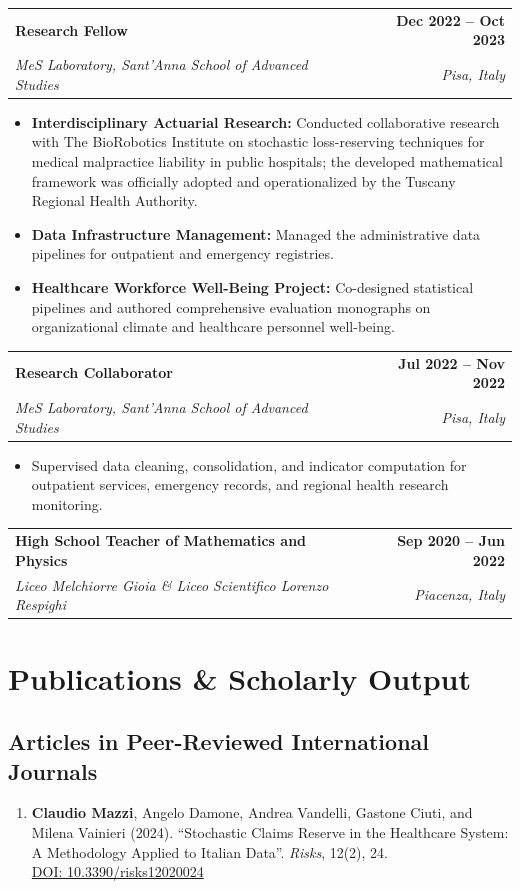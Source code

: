 \documentclass[10pt,a4paper]{article}
\makeatletter
\newcommand{\myname}{\textbf{Claudio Mazzi}}
\newcommand{\cventry}[5]{
  \vspace{2pt}
  \noindent
  \begin{tabularx}{\textwidth}{@{}X r@{}}
    \textbf{#1} & \textcolor{secondary}{\textbf{#2}} \\
    \textit{#3} & \textit{\textcolor{textdark}{#4}}
  \end{tabularx}
  \vspace{-1pt}
  {\small #5}
  \vspace{2pt}
}
\newcommand{\cvsimpleentry}[4]{
  \vspace{2pt}
  \noindent
  \begin{tabularx}{\textwidth}{@{}X r@{}}
    \textbf{#1} & \textcolor{secondary}{\textbf{#2}} \\
    \textit{#3} & \textit{\textcolor{textdark}{#4}}
  \end{tabularx}
  \vspace{1pt}
}
\makeatother
\begin{document}
\cventry{Research Fellow}{Dec 2022 -- Oct 2023}
{MeS Laboratory, Sant'Anna School of Advanced Studies}{Pisa, Italy}
{
\begin{itemize}
    \item \textbf{Interdisciplinary Actuarial Research:} Conducted collaborative research with The BioRobotics Institute on stochastic loss-reserving techniques for medical malpractice liability in public hospitals; the developed mathematical framework was officially adopted and operationalized by the Tuscany Regional Health Authority.
    \item \textbf{Data Infrastructure Management:} Managed the administrative data pipelines for outpatient and emergency registries.
    \item \textbf{Healthcare Workforce Well-Being Project:} Co-designed statistical pipelines and authored comprehensive evaluation monographs on organizational climate and healthcare personnel well-being.
\end{itemize}
}

\cventry{Research Collaborator}{Jul 2022 -- Nov 2022}
{MeS Laboratory, Sant'Anna School of Advanced Studies}{Pisa, Italy}
{
\begin{itemize}
    \item Supervised data cleaning, consolidation, and indicator computation for outpatient services, emergency records, and regional health research monitoring.
\end{itemize}
}

\cvsimpleentry{High School Teacher of Mathematics and Physics}{Sep 2020 -- Jun 2022}
{Liceo Melchiorre Gioia \& Liceo Scientifico Lorenzo Respighi}{Piacenza, Italy}

\newpage


\section{Publications \& Scholarly Output}

\subsection{Articles in Peer-Reviewed International Journals}
\begin{enumerate}
    \item \myname, Angelo Damone, Andrea Vandelli, Gastone Ciuti, and Milena Vainieri (2024). 
    ``Stochastic Claims Reserve in the Healthcare System: A Methodology Applied to Italian Data''. 
    \textit{Risks}, 12(2), 24. \\
    \href{https://doi.org/10.3390/risks12020024}{\small\color{secondary}\faExternalLink* DOI: 10.3390/risks12020024}
\end{enumerate}
\end{document}
